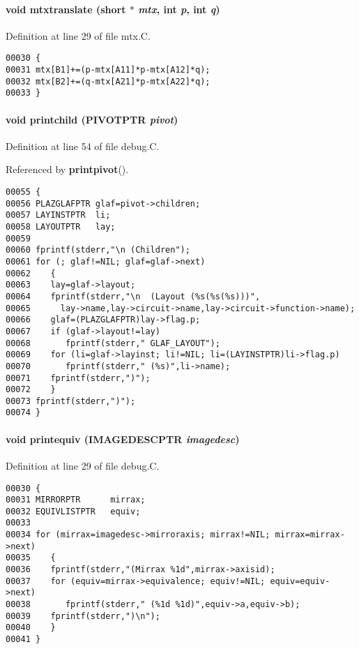 \paragraph{\setlength{\rightskip}{0pt plus 5cm}void mtxtranslate (short $\ast$ {\em mtx}, int {\em p}, int {\em q})}\hfill



Definition at line 29 of file mtx.C.\small\begin{verbatim}00030 {
00031 mtx[B1]+=(p-mtx[A11]*p-mtx[A12]*q);
00032 mtx[B2]+=(q-mtx[A21]*p-mtx[A22]*q);
00033 }
\end{verbatim}\normalsize 
\label{im.h_a21}
\paragraph{\setlength{\rightskip}{0pt plus 5cm}void printchild ({\bf PIVOTPTR} {\em pivot})}\hfill



Definition at line 54 of file debug.C.

Referenced by {\bf printpivot}().\small\begin{verbatim}00055 {
00056 PLAZGLAFPTR glaf=pivot->children;
00057 LAYINSTPTR  li;
00058 LAYOUTPTR   lay;
00059 
00060 fprintf(stderr,"\n (Children");
00061 for (; glaf!=NIL; glaf=glaf->next)
00062    {
00063    lay=glaf->layout;
00064    fprintf(stderr,"\n  (Layout (%s(%s(%s)))",
00065      lay->name,lay->circuit->name,lay->circuit->function->name);
00066    glaf=(PLAZGLAFPTR)lay->flag.p;
00067    if (glaf->layout!=lay)
00068       fprintf(stderr," GLAF_LAYOUT");
00069    for (li=glaf->layinst; li!=NIL; li=(LAYINSTPTR)li->flag.p)
00070       fprintf(stderr," (%s)",li->name);
00071    fprintf(stderr,")");
00072    }
00073 fprintf(stderr,")");
00074 }
\end{verbatim}\normalsize 
\label{im.h_a19}
\paragraph{\setlength{\rightskip}{0pt plus 5cm}void printequiv ({\bf IMAGEDESCPTR} {\em imagedesc})}\hfill



Definition at line 29 of file debug.C.\small\begin{verbatim}00030 {
00031 MIRRORPTR      mirrax;
00032 EQUIVLISTPTR   equiv;
00033 
00034 for (mirrax=imagedesc->mirroraxis; mirrax!=NIL; mirrax=mirrax->next)
00035    {
00036    fprintf(stderr,"(Mirrax %1d",mirrax->axisid);
00037    for (equiv=mirrax->equivalence; equiv!=NIL; equiv=equiv->next)
00038       fprintf(stderr," (%1d %1d)",equiv->a,equiv->b);
00039    fprintf(stderr,")\n");
00040    }
00041 }
\end{verbatim}\normalsize 
\label{im.h_a22}

